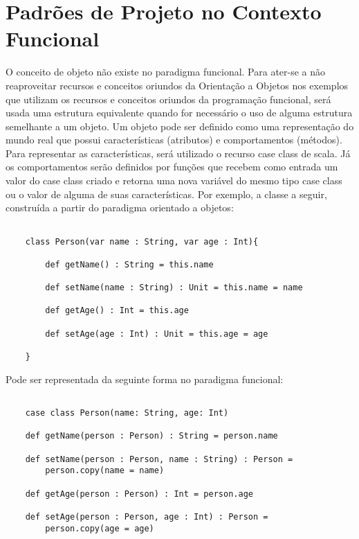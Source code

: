 
\chapter{Padrões de Projeto no Contexto Funcional}

O conceito de objeto não existe no paradigma funcional. 
Para ater-se a não reaproveitar recursos e conceitos 
oriundos da Orientação a Objetos nos exemplos que 
utilizam os recursos e conceitos oriundos da 
programação funcional, será usada uma estrutura 
equivalente quando for necessário o uso de alguma 
estrutura semelhante a um objeto.
Um objeto pode ser definido como uma representação 
do mundo real que possui características (atributos) 
e comportamentos (métodos). Para representar as 
características, será utilizado o recurso case 
class de scala. Já os comportamentos serão definidos 
por funções que recebem como entrada um valor do 
case class criado e retorna uma nova variável do 
mesmo tipo case class ou o valor de alguma de suas 
características. Por exemplo, a classe a seguir, 
construída a partir do paradigma orientado a objetos:



\begin{lstlisting}[caption={Classe comum em Orientação a Objetos},label=ooclass]
    
    class Person(var name : String, var age : Int){

        def getName() : String = this.name

        def setName(name : String) : Unit = this.name = name

        def getAge() : Int = this.age

        def setAge(age : Int) : Unit = this.age = age

    }   

\end{lstlisting}



Pode ser representada da seguinte forma no paradigma funcional:

\begin{lstlisting}[caption={Representação de uma classe no contexto funcional},label=pfclass]
    
    case class Person(name: String, age: Int)

    def getName(person : Person) : String = person.name

    def setName(person : Person, name : String) : Person = 
        person.copy(name = name)

    def getAge(person : Person) : Int = person.age

    def setAge(person : Person, age : Int) : Person =
        person.copy(age = age)

\end{lstlisting}